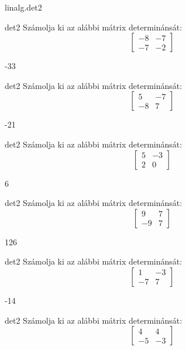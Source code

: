 \documentclass[12pt]{article}
\begin{document}
\begin{quiz}{linalg.det2}\begin{numerical}{det2}
Számolja ki az alábbi mátrix determinánsát:
$$\left[\begin{array}{cc}-8& -7\\ -7& -2\end{array}\right]$$

\item -33
\end{numerical}


\begin{numerical}{det2}
Számolja ki az alábbi mátrix determinánsát:
$$\left[\begin{array}{cc}5& -7\\ -8& 7\end{array}\right]$$

\item -21
\end{numerical}


\begin{numerical}{det2}
Számolja ki az alábbi mátrix determinánsát:
$$\left[\begin{array}{cc}5& -3\\ 2& 0\end{array}\right]$$

\item 6
\end{numerical}


\begin{numerical}{det2}
Számolja ki az alábbi mátrix determinánsát:
$$\left[\begin{array}{cc}9& 7\\ -9& 7\end{array}\right]$$

\item 126
\end{numerical}


\begin{numerical}{det2}
Számolja ki az alábbi mátrix determinánsát:
$$\left[\begin{array}{cc}1& -3\\ -7& 7\end{array}\right]$$

\item -14
\end{numerical}


\begin{numerical}{det2}
Számolja ki az alábbi mátrix determinánsát:
$$\left[\begin{array}{cc}4& 4\\ -5& -3\end{array}\right]$$


\end{numerical}
\end{quiz}
\end{document}
